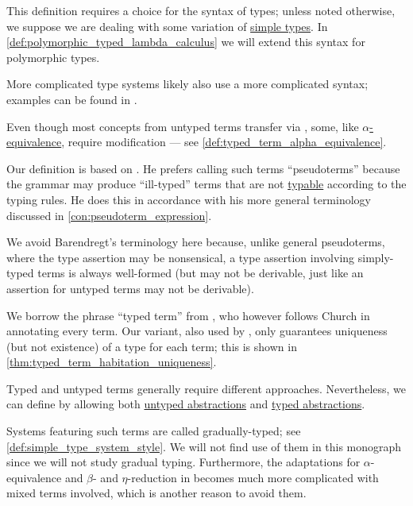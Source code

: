 \begin{comments}
  \item This definition requires a choice for the syntax of types; unless noted otherwise, we suppose we are dealing with some variation of \hyperref[def:simple_type]{simple types}. In \cref{def:polymorphic_typed_lambda_calculus} we will extend this syntax for polymorphic types.

  More complicated type systems likely also use a more complicated syntax; examples can be found in .

  \item Even though most concepts from untyped terms transfer via , some, like \hyperref[def:lambda_term_alpha_equivalence]{\( \alpha \)-equivalence}, require modification --- see \cref{def:typed_term_alpha_equivalence}.

  \item Our definition is based on . He prefers calling such terms \enquote{pseudoterms} because the grammar may produce \enquote{ill-typed} terms that are not \hyperref[def:typability]{typable} according to the typing rules. He does this in accordance with his more general terminology discussed in \cref{con:pseudoterm_expression}.

  We avoid Barendregt's terminology here because, unlike general pseudoterms, where the type assertion may be nonsensical, a type assertion involving simply-typed terms is always well-formed (but may not be derivable, just like an assertion for untyped terms may not be derivable).

  We borrow the phrase \enquote{typed term} from , who however follows Church in annotating every term. Our variant, also used by , only guarantees uniqueness (but not existence) of a type for each term; this is shown in \cref{thm:typed_term_habitation_uniqueness}.
\end{comments}

\begin{remark}\label{rem:mixed_lambda_term}\mimprovised
  Typed and untyped terms generally require different approaches. Nevertheless, we can define  by allowing both \hyperref[def:lambda_term]{untyped abstractions} and \hyperref[def:typed_lambda_term]{typed abstractions}.

  Systems featuring such terms are called gradually-typed; see \cref{def:simple_type_system_style}. We will not find use of them in this monograph since we will not study gradual typing. Furthermore, the adaptations for \( \alpha \)-equivalence and \( \beta \)- and \( \eta \)-reduction in  becomes much more complicated with mixed terms involved, which is another reason to avoid them.
\end{remark}

